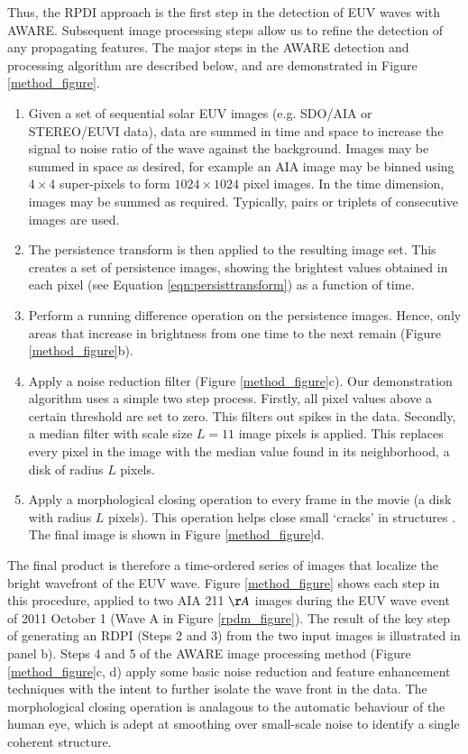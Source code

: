 Thus, the RPDI approach is the first step in the detection of EUV
waves with AWARE. Subsequent image processing steps allow us to refine
the detection of any propagating features. The major steps in the
AWARE detection and processing algorithm are described below, and are
demonstrated in Figure \ref{method_figure}.

\begin{enumerate}

\item Given a set of sequential solar EUV images (e.g. SDO/AIA or
  STEREO/EUVI data), data are summed in time and space to increase the
  signal to noise ratio of the wave against the background. Images may be summed in space as desired, for example an AIA image may be binned using $4\times4$ super-pixels to form $1024\times1024$ pixel images. In the time dimension, images may be summed as required. Typically, pairs or triplets of consecutive images are used.

\item The persistence transform is then applied to the resulting image
  set.  This creates a set of persistence images, showing the
  brightest values obtained in each pixel (see Equation
  \ref{eqn:persisttransform}) as a function of time.

\item Perform a running difference operation on the
  persistence images. Hence, only areas that increase in brightness
  from one time to the next remain (Figure \ref{method_figure}b).

\item Apply a noise reduction filter (Figure \ref{method_figure}c).
  Our demonstration algorithm uses a simple two step process.
  Firstly, all pixel values above a certain threshold are set to
  zero. This filters out spikes in the data. Secondly, a median filter
  with scale size $L=11$ image pixels is applied.  This replaces every
  pixel in the image with the median value found in its neighborhood,
  a disk of radius $L$ pixels.

\item Apply a morphological closing \citep{2002dip..book.....G}
  operation to every frame in the movie (a disk with radius $L$
  pixels).  This operation helps close small ‘cracks’ in structures
  \citep{2002dip..book.....G}.  The final image is shown in Figure
  \ref{method_figure}d.
\end{enumerate}

The final product is therefore a time-ordered series of images that
localize the bright wavefront of the EUV wave. Figure
\ref{method_figure} shows each step in this procedure, applied to two
AIA 211 $\AA$ images during the EUV wave event of 2011 October 1 (Wave
A in Figure \ref{rpdm_figure}). The result of the key step of
generating an RDPI (Steps 2 and 3) from the two input images is
illustrated in panel b). Steps 4 and 5 of the AWARE image processing
method (Figure \ref{method_figure}c, d) apply some basic noise
reduction and feature enhancement techniques with the intent to
further isolate the wave front in the data. The morphological closing operation is analagous to the automatic behaviour of the human eye, which is adept at smoothing over small-scale noise to identify a single coherent structure.

